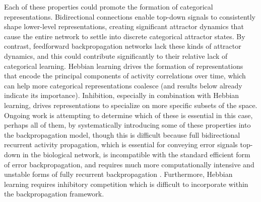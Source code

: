 \documentclass[12pt,twoside]{article}
\newif\myifpdf
\begin{document}

Each of these properties could promote the formation of categorical representations. Bidirectional connections enable top-down signals to consistently shape lower-level representations, creating significant attractor dynamics that cause the entire network to settle into discrete categorical attractor states. By contrast, feedforward backpropagation networks lack these kinds of attractor dynamics, and this could contribute significantly to their relative lack of categorical learning.  Hebbian learning drives the formation of representations that encode the principal components of activity correlations over time, which can help more categorical representations coalesce (and results below already indicate its importance).  Inhibition, especially in combination with Hebbian learning, drives representations to specialize on more specific subsets of the space.  Ongoing work is attempting to determine which of these is essential in this case, perhaps all of them, by systematically introducing some of these properties into the backpropagation model, though this is difficult because full bidirectional recurrent activity propagation, which is essential for conveying error signals top-down in the biological network, is incompatible with the standard efficient form of error backpropagation, and requires much more computationally intensive and unstable forms of fully recurrent backpropagation \cite{WilliamsZipser92,Pineda87}.  Furthermore, Hebbian learning requires inhibitory competition which is difficult to incorporate within the backpropagation framework.

\end{document}
